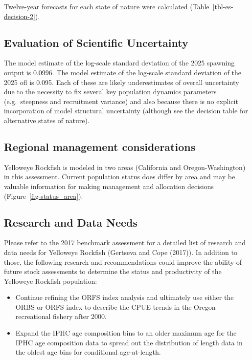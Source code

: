 \documentclass[
  english,
]{article}
\providecommand{\tightlist}{%
  \setlength{\itemsep}{0pt}\setlength{\parskip}{0pt}}
\begin{document}
Twelve-year forecasts for each state of nature were calculated
(Table~\ref{tbl-es-decision-2}).

\subsection{Evaluation of Scientific
Uncertainty}\label{evaluation-of-scientific-uncertainty}

The model estimate of the log-scale standard deviation of the 2025
spawning output is 0.0996. The model estimate of the log-scale standard
deviation of the 2025 \gls{ofl} is 0.095. Each of these are likely
underestimates of overall uncertainty due to the necessity to fix
several key population dynamics parameters (e.g.~steepness and
recruitment variance) and also because there is no explicit
incorporation of model structural uncertainty (although see the decision
table for alternative states of nature).

\subsection{Regional management
considerations}\label{regional-management-considerations}

Yelloweye Rockfish is modeled in two areas (California and
Oregon-Washington) in this assessment. Current population status does
differ by area and may be valuable information for making management and
allocation decisions (Figure~\ref{fig-status_area}).

\subsection{Research and Data Needs}\label{research-and-data-needs-1}

Please refer to the 2017 benchmark assessment for a detailed list of
research and data needs for Yelloweye Rockfish (Gertseva and Cope
(2017)). In addition to those, the following research and
recommendations could improve the ability of future stock assessments to
determine the status and productivity of the Yelloweye Rockfish
population:

\begin{itemize}
\tightlist
\item
  Continue refining the ORFS index analysis and ultimately use either
  the ORBS or ORFS index to describe the CPUE trends in the Oregon
  recreational fishery after 2000.
\item
  Expand the IPHC age composition bins to an older maximum age for the
  IPHC age composition data to spread out the distribution of length
  data in the oldest age bins for conditional age-at-length.
\end{itemize}
\end{document}
